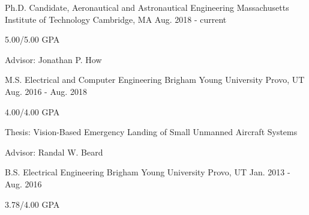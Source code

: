 

\begin{cventries}

\cventry
	{Ph.D. Candidate, Aeronautical and Astronautical Engineering} %
	{Massachusetts Institute of Technology} %
	{Cambridge, MA} %
	{Aug. 2018 - current} %
	{
		\begin{cvitems} %
			\item 5.00/5.00 GPA
			\item Advisor: Jonathan P. How
		\end{cvitems}
	}

\cventry
	{M.S. Electrical and Computer Engineering} %
	{Brigham Young University} %
	{Provo, UT} %
	{Aug. 2016 - Aug. 2018} %
	{
		\begin{cvitems} %
			\item 4.00/4.00 GPA
      \item Thesis: Vision-Based Emergency Landing of Small Unmanned Aircraft Systems
			\item Advisor: Randal W. Beard
		\end{cvitems}
	}
	
  \cventry
    {B.S. Electrical Engineering} %
    {Brigham Young University} %
    {Provo, UT} %
    {Jan. 2013 - Aug. 2016} %
    {
      \begin{cvitems} %
        \item 3.78/4.00 GPA
      \end{cvitems}
    }

\end{cventries}

